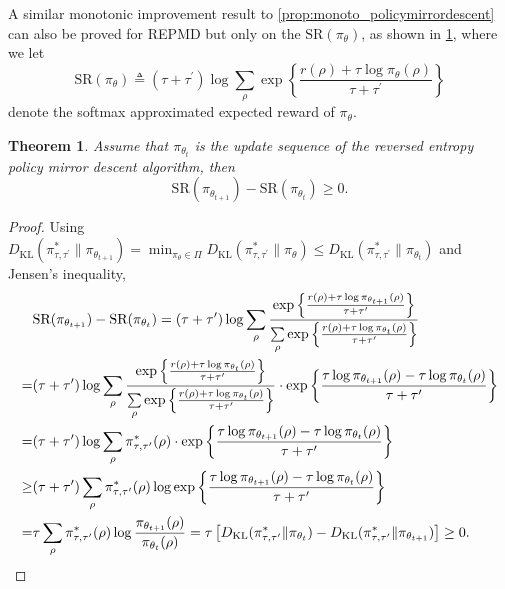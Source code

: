 \documentclass{article}
\newcommand{\todor}[2][]{\todo[color=blue!25,size=\small,#1]{R: #2}}
\newcommand{\KL}{D_{\text{KL}}}
\newcommand{\SR}{\text{SR}}
\newcommand{\pithetat}{\pi_{\theta_t}}
\newtheorem{thm}{Theorem}
\begin{document}
A similar monotonic improvement result to \cref{prop:monoto_policymirrordescent} can also be proved for REPMD but only on the $\SR(\pi_\theta) $, as shown in \cref{thm:monotonically_increasing_sr_property}, where we let
\[
\SR(\pi_\theta) \triangleq (\tau + \tau^{\prime})\log{ \sum_{\rho}{ \exp\left\{ \frac{r(\rho) + \tau \log{\pi_\theta(\rho)} }{\tau + \tau^{\prime}} \right\} }}
\]
denote the softmax approximated expected reward of $\pi_\theta$.
\begin{thm}
	\label{thm:monotonically_increasing_sr_property}
	Assume that $\pi_{\theta_{t}}$ is the update sequence of the reversed entropy policy mirror descent algorithm, then 
	\[
	\SR(\pi_{\theta_{t+1}}) - \SR(\pithetat)\ge 0.
	\] 
\end{thm}
\begin{proof}
	Using $\KL(\pi_{\tau,\tau^{\prime}}^* \| \pi_{\theta_{t+1}}) = \min_{\pi_\theta \in \Pi}{ \KL(\pi_{\tau,\tau^{\prime}}^* \| \pi_\theta)} \le \KL(\pi_{\tau,\tau^{\prime}}^* \| \pithetat)$ and Jensen's inequality,
	\begin{equation*}
	\begin{split}
	&\SR(\pi_{\theta_{t+1}}) - \SR(\pithetat) = (\tau + \tau^{\prime}) \log{ \sum\limits_{\rho}{ \frac{  \exp\left\{ \frac{r(\rho) + \tau \log{\pi_{\theta_{t+1}}(\rho)} }{\tau + \tau^{\prime}} \right\}  }{ \sum\limits_{\rho}{  \exp\left\{ \frac{r(\rho) + \tau \log{\pithetat(\rho)} }{\tau + \tau^{\prime}} \right\} } }  } } \\
	=& (\tau + \tau^{\prime}) \log{ \sum\limits_{\rho}{ \frac{  \exp\left\{ \frac{r(\rho) + \tau \log{\pithetat(\rho)} }{\tau + \tau^{\prime}} \right\}  }{ \sum\limits_{\rho}{  \exp\left\{ \frac{r(\rho) + \tau \log{\pithetat(\rho)} }{\tau + \tau^{\prime}} \right\} } }  } \cdot \exp\left\{ \frac{\tau \log{\pi_{\theta_{t+1}}(\rho)} - \tau \log{\pithetat(\rho)} }{\tau + \tau^{\prime}} \right\} } \\
	=& (\tau + \tau^{\prime}) \log{ \sum\limits_{\rho}{ \pi_{\tau,\tau^{\prime}}^*(\rho) } \cdot \exp\left\{ \frac{\tau \log{\pi_{\theta_{t+1}}(\rho)} - \tau \log{\pithetat(\rho)} }{\tau + \tau^{\prime}} \right\} } \\
	\ge& (\tau + \tau^{\prime}) \sum\limits_{\rho}{ \pi_{\tau,\tau^{\prime}}^*(\rho) \log{ \exp\left\{ \frac{\tau \log{\pi_{\theta_{t+1}}(\rho)} - \tau \log{\pithetat(\rho)} }{\tau + \tau^{\prime}} \right\} } } \\
	=& \tau \sum\limits_{\rho}{ \pi_{\tau,\tau^{\prime}}^*(\rho) \log{ \frac{\pi_{\theta_{t+1}}(\rho)}{\pithetat(\rho)} } } = \tau \left[ \KL(\pi_{\tau,\tau^{\prime}}^* \| \pithetat) - \KL(\pi_{\tau,\tau^{\prime}}^* \| \pi_{\theta_{t+1}})\right] \ge 0. \qedhere
	\end{split}
	\end{equation*}
\end{proof}
\end{document}
